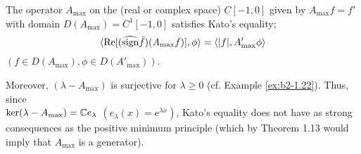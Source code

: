 \begin{example}\label{ex:b2-2.12}
The operator $A_{\max}$ on the (real or complex space) $C[-1,0]$ given by $A_{\max}f = f'$ with domain $D(A_{\max}) = C^{1}[-1,0]$ satisfies Kato's equality; \ie 
\begin{equation}\label{eq:b2-2.16}
\langle \mathop{}\!\mathrm{Re}[(\widehat{\operatorname{sign}} \bar{f})(A_{\max}f)],\phi \rangle = \langle |f|,A'_{\max}\phi \rangle
\end{equation}
$(f \in D(A_{\max}), \phi \in D(A'_{\max}))$.

Moreover, $(\lambda - A_{\max})$ is surjective for $\lambda \geq 0$ (cf. Example  \ref{ex:b2-1.22}).
Thus, since \\
$\ker(\lambda - A_{\max}) = \mathbb{C} e_{\lambda}$ $(e_{\lambda}(x) = \mathrm{e}^{\lambda x})$, Kato's equality does not have as strong consequences as the positive minimum principle (which by Theorem 1.13 would imply that $A_{\max}$ is a generator).
\end{example}

